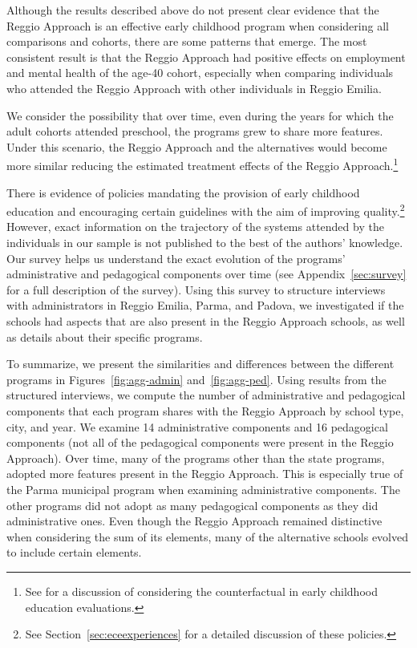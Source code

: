 Although the results described above do not present clear evidence that the Reggio Approach is an effective early childhood program when considering all comparisons and cohorts, there are some patterns that emerge. The most consistent result is that the Reggio Approach had positive effects on employment and mental health of the age-40 cohort, especially when comparing individuals who attended the Reggio Approach with other individuals in Reggio Emilia.

We consider the possibility that over time, even during the years for which the adult cohorts attended preschool, the programs grew to share more features. Under this scenario, the Reggio Approach and the alternatives would become more similar reducing the estimated treatment effects of the Reggio Approach.\footnote{See \citet{Elango_Hojman_etal_2016_Early-Edu} for a discussion of considering the counterfactual in early childhood education evaluations.} 

There is evidence of policies mandating the provision of early childhood education and encouraging certain guidelines with the aim of improving quality.\footnote{See Section~\ref{sec:eceexperiences} for a detailed discussion of these policies.} However, exact information on the trajectory of the systems attended by the individuals in our sample is not published to the best of the authors' knowledge. Our survey helps us understand the exact evolution of the programs' administrative and pedagogical components over time (see Appendix~\ref{sec:survey} for a full description of the survey). Using this survey to structure interviews with administrators in Reggio Emilia, Parma, and Padova, we investigated if the schools had aspects that are also present in the Reggio Approach schools, as well as details about their specific programs. 

To summarize, we present the similarities and differences between the different programs in Figures~\ref{fig:agg-admin} and~\ref{fig:agg-ped}. Using results from the structured interviews, we compute the number of administrative and pedagogical components that each program shares with the Reggio Approach by school type, city, and year. We examine 14 administrative components and 16 pedagogical components (not all of the pedagogical components were present in the Reggio Approach). Over time, many of the programs other than the state programs, adopted more features present in the Reggio Approach. This is especially true of the Parma municipal program when examining administrative components. The other programs did not adopt as many pedagogical components as they did administrative ones. Even though the Reggio Approach remained distinctive when considering the sum of its elements, many of the alternative schools evolved to include certain elements.

